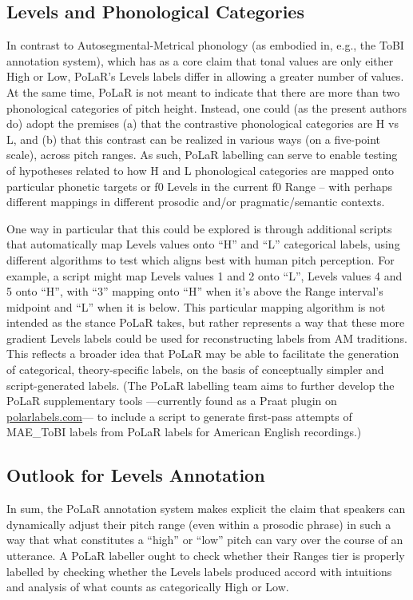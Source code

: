 \subsection{Levels and Phonological Categories}\label{sec:levels-and-phonological-categories}
In contrast to Autosegmental-Metrical phonology (as embodied in, e.g., the ToBI annotation system), which has as a core claim that tonal values are only either High or Low, PoLaR’s Levels labels differ in allowing a greater number of values. At the same time, PoLaR is not meant to indicate that there are more than two phonological categories of pitch height. Instead, one could (as the present authors do) adopt the premises (a) that the contrastive phonological categories are H vs L, and (b) that this contrast can be realized in various ways (on a five-point scale), across pitch ranges. As such, PoLaR labelling can serve to enable testing of hypotheses related to how H and L phonological categories are mapped onto particular phonetic targets or f0 Levels in the current f0 Range – with perhaps different mappings in different prosodic and/or pragmatic\slash semantic contexts.

One way in particular that this could be explored is through additional scripts that automatically map Levels values onto “H” and “L” categorical labels, using different algorithms to test which aligns best with human pitch perception. For example, a script might map Levels values 1 and 2 onto “L”, Levels values 4 and 5 onto “H”, with “3” mapping onto “H” when it’s above the Range interval’s midpoint and “L” when it is below. This particular mapping algorithm is not intended as the stance PoLaR takes, but rather represents a way that these more gradient Levels labels could be used for reconstructing labels from AM traditions. This reflects a broader idea that PoLaR may be able to facilitate the generation of categorical, theory-specific labels, on the basis of conceptually simpler and script-generated labels. (The PoLaR labelling team aims to further develop the PoLaR supplementary tools —currently found as a Praat plugin on \href{https://www.polarlabels.com}{polarlabels.com}— to include a script to generate first-pass attempts of MAE\_ToBI labels from PoLaR labels for American English recordings.)


\subsection{Outlook for Levels Annotation}\label{sec:outlook-for-levels-annotation}
In sum, the PoLaR annotation system makes explicit the claim that speakers can dynamically adjust their pitch range (even within a prosodic phrase) in such a way that what constitutes a “high” or “low” pitch can vary over the course of an utterance. A PoLaR labeller ought to check whether their Ranges tier is properly labelled by checking whether the Levels labels produced accord with intuitions and analysis of what counts as categorically High or Low. 

